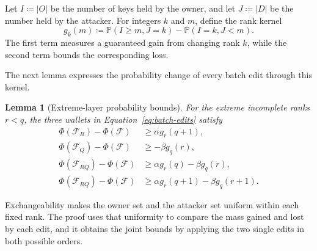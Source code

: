 \documentclass[11pt]{article}
\newtheorem{lemma}[theorem]{Lemma}
\newcommand{\Prob}{\ensuremath{\mathbb P}\xspace}
\newcommand{\cF}{\ensuremath{\mathcal F}\xspace}
\begin{document}
Let ${I\coloneqq|O|}$ be the number of keys held by the owner, and let ${J\coloneqq|D|}$ be the number held by the attacker.
For integers $k$ and $m$, define the rank kernel
\begin{equation}
g_k(m)
\coloneqq
\Prob(I\geq m,J=k)-\Prob(I=k,J<m).
\label{eq:rank-kernel}
\end{equation}
The first term measures a guaranteed gain from changing rank $k$, while the second term bounds the corresponding loss.

The next lemma expresses the probability change of every batch edit through this kernel.

\begin{lemma}[Extreme-layer probability bounds]\label{lem:edit-bounds}
For the extreme incomplete ranks ${r<q}$, the three wallets in Equation~\eqref{eq:batch-edits} satisfy
\begin{align}
\Phi(\cF_R)-\Phi(\cF)
&\geq \alpha g_r(q+1),
\label{eq:remove-bound-alt}\\
\Phi(\cF_Q)-\Phi(\cF)
&\geq-\beta g_q(r),
\label{eq:fill-bound-alt}\\
\Phi(\cF_{RQ})-\Phi(\cF)
&\geq\alpha g_r(q)-\beta g_q(r),
\label{eq:joint-bound-a-alt}\\
\Phi(\cF_{RQ})-\Phi(\cF)
&\geq\alpha g_r(q+1)-\beta g_q(r+1).
\label{eq:joint-bound-b-alt}
\end{align}
\end{lemma}

Exchangeability makes the owner set and the attacker set uniform within each fixed rank.
The proof uses that uniformity to compare the mass gained and lost by each edit, and it obtains the joint bounds by applying the two single edits in both possible orders.
\end{document}
